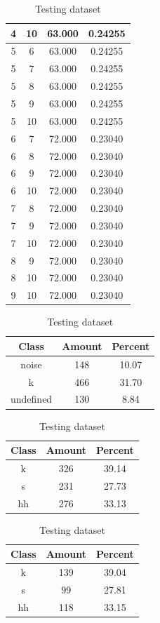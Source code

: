 \begin{table}
\begin{subtable}[h]{0.45\textwidth}
{\begin{tabular}{|c|c|c|c|}
 4 & 10 & 63.000 & 0.24255\\ \hline 
 5 & 6 & 63.000 & 0.24255\\ \hline 
 5 & 7 & 63.000 & 0.24255\\ \hline 
 5 & 8 & 63.000 & 0.24255\\ \hline 
 5 & 9 & 63.000 & 0.24255\\ \hline 
 5 & 10 & 63.000 & 0.24255\\ \hline 
 6 & 7 & 72.000 & 0.23040\\ \hline 
 6 & 8 & 72.000 & 0.23040\\ \hline 
 6 & 9 & 72.000 & 0.23040\\ \hline 
 6 & 10 & 72.000 & 0.23040\\ \hline 
 7 & 8 & 72.000 & 0.23040\\ \hline 
 7 & 9 & 72.000 & 0.23040\\ \hline 
 7 & 10 & 72.000 & 0.23040\\ \hline 
 8 & 9 & 72.000 & 0.23040\\ \hline 
 8 & 10 & 72.000 & 0.23040\\ \hline 
 9 & 10 & 72.000 & 0.23040\\ \hline 

\end{tabular}
}\label{xlsflux52}
\caption{xcsflux52}
\end{subtable}

\begin{subtable}[h]{0.45\textwidth}
\centering
\begin{tabular}{|c|c|c|}
\hline
Class & Amount & Percent\\ \hline
noise & 148 & 10.07\\ \hline
k & 466 & 31.70\\ \hline
undefined & 130 & 8.84\\ \hline
\end{tabular}
\caption{Entire dataset after stripping short sounds}
\end{subtable}
\hfill
\begin{subtable}[h]{0.45\textwidth}
\centering
\begin{tabular}{|c|c|c|}
\hline
Class & Amount & Percent\\ \hline
k & 326 & 39.14\\ \hline
s & 231 & 27.73\\ \hline
hh & 276 & 33.13\\ \hline
\end{tabular}
\caption{Training dataset}
\end{subtable}
\hfill
\begin{subtable}[h]{0.45\textwidth}
\centering
\begin{tabular}{|c|c|c|}
\hline
Class & Amount & Percent\\ \hline
k & 139 & 39.04\\ \hline
s & 99 & 27.81\\ \hline
hh & 118 & 33.15\\ \hline
\end{tabular}
\caption{Testing dataset}
\end{subtable}
\hfill


\end{table}
